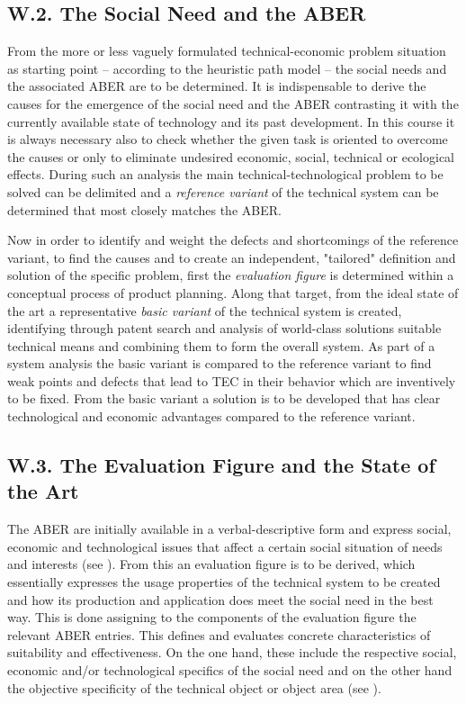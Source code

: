 \documentclass[11pt,a4paper]{article}
\begin{document}
\subsection*{W.2. The Social Need and the ABER}

From the more or less vaguely formulated technical-economic problem situation
as starting point -- according to the heuristic path model -- the social needs
and the associated ABER are to be determined. It is indispensable to derive
the causes for the emergence of the social need and the ABER contrasting it
with the currently available state of technology and its past development.  In
this course it is always necessary also to check whether the given task is
oriented to overcome the causes or only to eliminate undesired economic,
social, technical or ecological effects.  During such an analysis the main
technical-technological problem to be solved can be delimited and a
\emph{reference variant} of the technical system can be determined that most
closely matches the ABER.

Now in order to identify and weight the defects and shortcomings of the
reference variant, to find the causes and to create an independent, "tailored"
definition and solution of the specific problem, first the \emph{evaluation
  figure} is determined within a conceptual process of product planning. Along
that target, from the ideal state of the art a representative \emph{basic
  variant} of the technical system is created, identifying through patent
search and analysis of world-class solutions suitable technical means and
combining them to form the overall system. As part of a system analysis the
basic variant is compared to the reference variant to find weak points and
defects that lead to TEC in their behavior which are inventively to be fixed.
From the basic variant a solution is to be developed that has clear
technological and economic advantages compared to the reference variant.

\subsection*{W.3. The Evaluation Figure and the State of the Art}

The ABER are initially available in a verbal-descriptive form and express
social, economic and technological issues that affect a certain social
situation of needs and interests (see \cite[A.1]{RM-21}). From this an
evaluation figure is to be derived, which essentially expresses the usage
properties of the technical system to be created and how its production and
application does meet the social need in the best way. This is done assigning
to the components of the evaluation figure the relevant ABER entries. This
defines and evaluates concrete characteristics of suitability and
effectiveness. On the one hand, these include the respective social, economic
and/or technological specifics of the social need and on the other hand the
objective specificity of the technical object or object area (see
\cite[(1.3)]{RM-21}).
\end{document}
